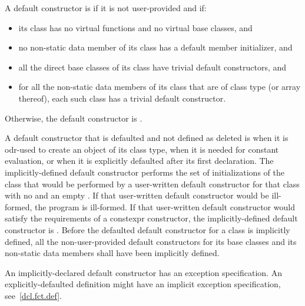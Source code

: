 \pnum
A default constructor is
if it is not user-provided and if:

\begin{itemize}
\item
its class has no virtual functions and no virtual base
classes, and

\item no non-static data member of its class has
a default member initializer, and

\item
all the direct base classes of its class have trivial default constructors, and

\item
for all the non-static data members of its class that are of class
type (or array thereof), each such class has a trivial default constructor.
\end{itemize}

Otherwise, the default constructor is
.

\pnum
A default constructor
that is defaulted and not defined as deleted
is
when it is odr-used
to create an object of its class type,
when it is needed for constant evaluation, or
when it is explicitly defaulted after its first declaration.
The implicitly-defined default constructor performs the set of
initializations of the class that would be performed by a user-written default
constructor for that class with no
 and an empty
.
If that user-written default constructor would be ill-formed,
the program is ill-formed.
If that user-written default constructor would satisfy the requirements
of a constexpr constructor, the implicitly-defined
default constructor is .
Before the defaulted default constructor for a class is
implicitly defined,
all the non-user-provided default constructors for its base classes and
its non-static data members shall have been implicitly defined.
\begin{note}
An implicitly-declared default constructor has an
exception specification.
An explicitly-defaulted definition might have an
implicit exception specification, see~\ref{dcl.fct.def}.
\end{note}

